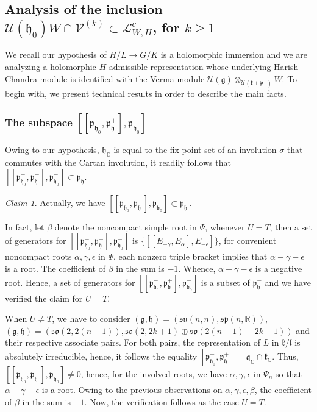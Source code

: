 \documentclass[12pt]{amsart}
\theoremstyle{definition}
\theoremstyle{remark}
\newtheorem{claim}[thm]{Claim}
\newcommand{\g}{\mathfrak{g}}
\newcommand{\h}{\mathfrak{h}}
\renewcommand{\k}{{\mathfrak k}}
\renewcommand{\l}{\mathfrak l}
\newcommand{\p}{\mathfrak p}
\newcommand{\q}{\mathfrak q}
\newcommand{\C}{{\mathbb C}}
\numberwithin{equation}{section}
\begin{document}
\subsection{Analysis of the inclusion $\mathcal U(\h_0)W\cap \mathcal V^{(k)}\subset \mathcal L_{W,H}^c $, for $k\geq 1$}
 We recall  our hypothesis of $H/L \rightarrow G/K$ is a holomorphic immersion and we are analyzing a holomorphic    $H$-admissible representation whose underlying Harish-Chandra module is identified with the Verma module $\mathcal U(\g)\otimes_{\mathcal U(\k +\p^+)} W $.
To begin with, we present technical results in order to describe the main facts.
     \subsubsection{The subspace $[[\p_{\h_0}^-, \p_\h^+],\p_{\h_0}^- ]$}\label{sub:triplebrack} Owing to our hypothesis, $\h_\C$ is equal to the fix point set of an involution $\sigma$ that commutes
      with the Cartan involution, it readily follows that $[[\p_{\h_0}^-, \p_\h^+],\p_{\h_0}^- ]\subset \p_\h$.

   \begin{claim}\label{prop:triplein}  Actually,   we have $[[\p_{\h_0}^-, \p_\h^+],\p_{\h_0}^- ]\subset \p_\h^-$.
   \end{claim}

      In fact,   let $\beta$ denote the noncompact simple root in $\Psi$, whenever $U=T$,  then a set of generators for $[[\p_{\h_0}^-, \p_\h^+],\p_{\h_0}^- ]$ is $\{[[E_{-\gamma}, E_{\alpha}],E_{-\epsilon}]\}$, for convenient noncompact roots  $\alpha, \gamma, \epsilon $ in $\Psi$,    each nonzero    triple bracket     implies   that $\alpha -\gamma -\epsilon $ is a root. The coefficient of $\beta$ in the sum is $-1$. Whence, $\alpha -\gamma -\epsilon $   is a negative root. Hence, a set of generators for $[[\p_{\h_0}^-, \p_\h^+],\p_{\h_0}^- ]$  is a subset of $\p_\h^-$  and we have verified the claim for $U=T$.

When $U\not= T$,    we have to consider $(\g, \h)=(\mathfrak{su}(n,n), \mathfrak{sp}(n,\mathbb R))$, $(\g, \h)=(\mathfrak{so}(2,2(n-1)), \mathfrak{so}(2,2k+1)\oplus \mathfrak{so}(2(n-1)-2k-1))$ and their respective associate pairs.
For both pairs,  the representation of $L$ in $\k/\l $ is absolutely irreducible, hence,  it  follows the equality $[\p_{\h_0}^-, \p_\h^+]=\q_\C \cap \k_\C$. Thus,   $[[\p_{\h_0}^-, \p_\h^+],\p_{\h_0}^- ]\not = 0$, hence, for the involved roots, we have $\alpha, \gamma, \epsilon$ in $\Psi_n $
so that $\alpha -\gamma -\epsilon $ is a root. Owing to the previous observations on $\alpha, \gamma, \epsilon, \beta$, the coefficient of $\beta$ in the sum is $-1$. Now, the verification follows as the case $U=T$.
\end{document}
